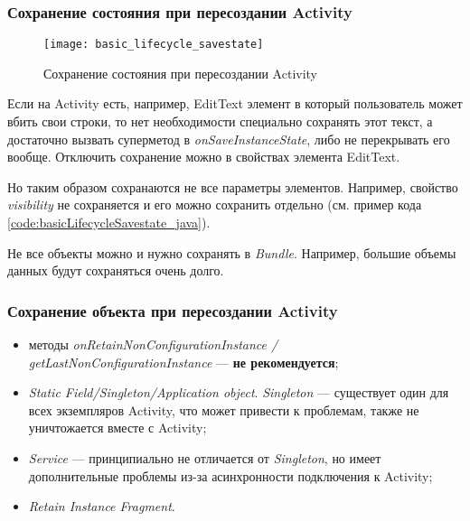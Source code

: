 	
\subsubsection{Сохранение состояния при пересоздании Activity}

	\begin{figure}[H]
	    \centering
	    \texttt{[image: basic\_lifecycle\_savestate]}
	    \caption{Сохранение состояния при пересоздании Activity}
	    \label{fig:basic_lifecycle_savestate}
	\end{figure}
	
	
	
	
Если на Activity есть, например, EditText элемент в который пользователь может вбить свои строки, то нет необходимости специально сохранять этот текст, а достаточно вызвать суперметод в \textit{onSaveInstanceState}, либо не перекрывать его вообще. Отключить сохранение можно в свойствах элемента EditText.

Но таким образом сохранаются не все параметры элементов. Например, свойство \textit{visibility} не сохраняется и его можно сохранить отдельно (см. пример кода \ref{code:basicLifecycleSavestate_java}).

Не все объекты можно и нужно сохранять в \textit{Bundle}. Например, большие объемы данных будут сохраняться очень долго. 


\subsubsection{Сохранение объекта при пересоздании Activity}

\begin{itemize}
	\item методы \textit{onRetainNonConfigurationInstance / \newline getLastNonConfigurationInstance} --- \textbf{не рекомендуется};
	\item \textit{Static Field/Singleton/Application object}. \newline \textit{Singleton} --- существует один для всех экземпляров Activity, что может привести к проблемам, также не уничтожается вместе с Activity;
	\item \textit{Service} --- принципиально не отличается от \textit{Singleton}, но имеет дополнительные проблемы из-за асинхронности подключения к Activity;
	\item \textit{Retain Instance Fragment}.
\end{itemize}